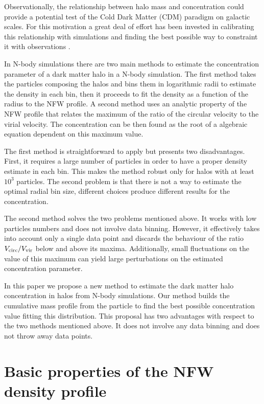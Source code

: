 \documentclass[a4,useAMS,usenatbib,usegraphicx]{mn2e}
\begin{document}
Observationally, the relationship between halo mass and concentration
could provide a potential test of the Cold Dark Matter (CDM) paradigm
on galactic scales. 
For this motivation a great deal of effort has been
invested in calibrating this relationship with simulations
\citep{Neto2007,Duffy2008,Munoz2011,Prada2012,Ludlow2014} and 
finding the best possible way to constraint it with observations
\citep{Buote2007,Comerford2007,Mandelbaum2008,Giocoli2014,Foex2014,Shan2015}.  


In N-body simulations there are two main methods to estimate the
concentration parameter of a dark matter halo in a N-body simulation.
The first method takes the particles composing the halos
and bins them in logarithmic radii to estimate the density in each
bin, then it proceeds to fit the density as a function of the radius
to the NFW profile.
A second method uses an analytic property of the
NFW profile that relates the maximum of the ratio of the circular velocity to
the virial velocity.
The concentration can be then found as the root of a algebraic 
equation dependent on this maximum value.


The first method is straightforward to apply but presents two
disadvantages.
First, it requires a large number of particles in
order to have a proper density estimate in each bin.
This makes the method robust only for halos with at least  $10^3$
particles.
The second problem is that there is not a way to estimate the optimal
radial bin size, different choices produce different results for the
concentration. 

The second method solves the two problems mentioned above.
It works with low particles numbers and does not involve data
binning.
However, it effectively takes into account only a single data point
and discards the behaviour of the ratio $V_{\rm circ}/V_{\rm vir}$ below and
above its maxima.
Additionally, small fluctuations on the value of this maximum can
yield large perturbations on the estimated concentration parameter.

In this paper we propose a new method to estimate the dark matter halo
concentration in halos from N-body simulations.
Our method builds the cumulative mass profile from the particle
to find the best possible concentration value fitting this
distribution. 
This proposal has two advantages with respect to the two methods mentioned
above. 
It does not involve any data binning and does not throw away data points.



\section{Basic properties of the NFW density profile}
\label{sec:basics}
\end{document}
